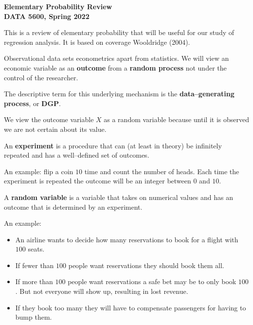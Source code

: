 \documentclass[11pt]{article}
\begin{document}
\pagestyle{empty}

\textbf{Elementary Probability Review} \\
\textbf{DATA 5600, Spring 2022} \\
\vspace{3.5mm}


This is a review of elementary probability that will be useful for our study of regression analysis. It is based on coverage Wooldridge (2004).

\vspace{3.5mm}

Observational data sets econometrics apart from statistics.  We will view an economic variable as an \textbf{outcome}
from a \textbf{random process} not under the control of the researcher.

\vspace{2mm}

The descriptive term for this underlying mechanism is the \textbf{data--generating process}, or \textbf{DGP}.

\vspace{2mm}

We view the outcome variable $X$ as a random variable because until it is observed we are not certain about its value.

\vspace{2mm}

An \textbf{experiment} is a procedure that can (at least in theory) be infinitely repeated and has a well--defined set 
of outcomes.

\vspace{2mm}
An example: flip a coin $10$ time and count the number of heads. Each time the experiment is repeated the outcome will 
be an integer between $0$ and $10$.

\vspace{2mm}

A \textbf{random variable} is a variable that takes on numerical values and has an outcome that is determined by an experiment.
\vspace{2mm}

An example: 

\begin{itemize}
 \item An airline wants to decide how many reservations to book for a flight with $100$ seats.
 \item If fewer than $100$ people want reservations they should book them all.
 \item If more than $100$ people want reservations a safe bet may be to only book $100$. But not everyone will show up, resulting
       in lost revenue.
 \item If they book too many they will have to compensate passengers for having to bump them.
\end{itemize}
\end{document}
